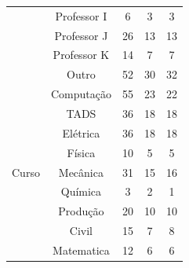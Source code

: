 \begin{table}[ht]
\begin{tabular}{ccccc}
                                        & Professor I              & 6                                         & 3                    & 3                               \\
                                        & Professor J              & 26                                        & 13                   & 13                              \\
                                        & Professor K              & 14                                        & 7                    & 7                               \\
                                        & Outro                    & 52                                        & 30                   & 32                              \\
  \hline
  \multirow{9}{*}{Curso}                & Computação               & 55                                        & 23                   & 22                              \\
                                        & TADS                     & 36                                        & 18                   & 18                              \\
                                        & Elétrica                 & 36                                        & 18                   & 18                              \\
                                        & Física                   & 10                                        & 5                    & 5                               \\
                                        & Mecânica                 & 31                                        & 15                   & 16                              \\
                                        & Química                  & 3                                         & 2                    & 1                               \\
                                        & Produção                 & 20                                        & 10                   & 10                              \\
                                        & Civil                    & 15                                        & 7                    & 8                               \\
                                        & Matematica               & 12                                        & 6                    & 6                               \\

\end{tabular}
\end{table}

